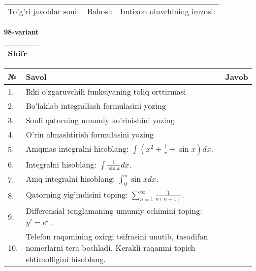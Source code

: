 \documentclass{article}
\begin{document}
  \vspace{1cm}
  
  \begin{tabular}{lll}
  To'g'ri javoblar soni: \underline{\hspace{1.5cm}} & 
  Bahosi: \underline{\hspace{1.5cm}} & 
  Imtixon oluvchining imzosi: \underline{\hspace{2cm}} \\
  \end{tabular}
  
  \egroup
  
  \newpage
  
  
  \textbf{98-variant}\\
  
  \bgroup
  \def\arraystretch{1.6} %
  
  \begin{tabular}{|m{5.7cm}|m{9.5cm}|}
  \hline
  Shifr & \\
  \hline
  \end{tabular}
  
  \vspace{1cm}
  
  \begin{tabular}{|m{0.7cm}|m{10cm}|m{4cm}|}
  \hline
  № & Savol & Javob \\
  \hline
  1. & Ikki o'zgaruvchili funksiyaning toliq orttirmasi &  \\
  \hline
  2. & Bo'laklab integrallash formulasini yozing &  \\
  \hline
  3. & Sonli qatorning umumiy ko'rinishini yozing &  \\
  \hline
  4. & O'rin almashtirish formulasini yozing &  \\
  \hline
  5. & Aniqmas integralni hisoblang: \(\int {\left( x^{2} + \frac{1}{x} + \sin x \right)dx}\). &  \\
  \hline
  6. & Integralni hisoblang: \(\int {\frac{1}{\sin x}dx}\). &  \\
  \hline
  7. & Aniq integralni hisoblang: \(\int_{0}^{\pi}{\sin xdx}\). &  \\
  \hline
  8. & Qatorning yig'indisini toping: \(\sum_{n = 1}^{\infty}\frac{1}{n(n + 1)}\). &  \\
  \hline
  9. & Differensial tenglamaning umumiy echimini toping: \(y' = e^{x}\). &  \\
  \hline
  10. & Telefon raqamining oxirgi tsifrasini unutib, tasodifan nomerlarni tera boshladi. Kerakli raqamni topish ehtimolligini hisoblang. &  \\
  \hline
  \end{tabular}
  
\end{document}
